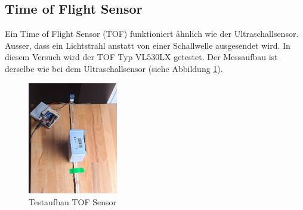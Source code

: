 \newpage
\subsection{Time of Flight Sensor}
Ein Time of Flight Sensor (TOF) funktioniert ähnlich wie der Ultraschallsensor. Ausser, dass ein Lichtstrahl anstatt von einer Schallwelle ausgesendet wird. In diesem Versuch wird der TOF Typ VL530LX getestet. Der Messaufbau ist derselbe wie bei dem Ultraschallsensor (siehe Abbildung \ref{fig:TOF1}).

\begin{figure}[h!] %
    \centering
    \includegraphics[width=0.35\textwidth]{img/sensortest/MA_TOF.jpg} %
    \caption{Testaufbau TOF Sensor}
    \label{fig:TOF1} %
\end{figure}


